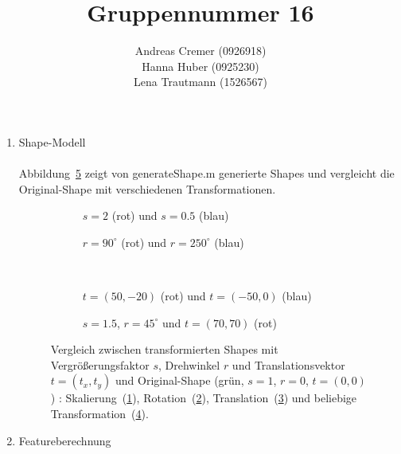 \documentclass[]{report}
\title{Gruppennummer 16}
\author{Andreas Cremer (0926918)\\Hanna Huber (0925230) \\Lena Trautmann (1526567)}
\newlength\figureheight
\newlength\figurewidth
\begin{document}
	\maketitle
	
	
	\begin{enumerate}
		\item Shape-Modell \\\\
			Abbildung~\ref{fig:trafo} zeigt von generateShape.m generierte Shapes und vergleicht die Original-Shape mit verschiedenen Transformationen.
			\setlength\figureheight{3.5cm}
			\setlength{}
			\begin{figure}
				\begin{subfigure}{0.45\textwidth}
					\centering
					
					\caption{$s=2$ (rot) und $s=0.5$ (blau)}
					\label{fig:s}
				\end{subfigure}
				\qquad
				\begin{subfigure}{0.45\textwidth}
					\centering
					
					\caption{$r=90^\circ$ (rot) und $r=250^\circ$  (blau)}
					\label{fig:r}
				\end{subfigure}	
				\\
				\begin{subfigure}{0.45\textwidth}
					\centering
					
					\caption{$t=(50,-20)$ (rot) und $t=(-50,0)$ (blau)}
					\label{fig:t}
				\end{subfigure}
				\qquad
				\begin{subfigure}{0.45\textwidth}
					\centering
					
					\caption{$s=1.5$, $r=45^\circ$ und $t=(70,70)$ (rot)}
					\label{fig:mix}
				\end{subfigure}	
				\caption{Vergleich zwischen transformierten Shapes mit Vergrößerungsfaktor $s$, Drehwinkel $r$ und Translationsvektor $t=(t_x,t_y)$ und Original-Shape (grün, $s=1$, $r=0$, $t=(0,0)$) : Skalierung~(\ref{fig:s}), Rotation~(\ref{fig:r}), Translation~(\ref{fig:t}) und beliebige Transformation~(\ref{fig:mix}).}
				\label{fig:trafo}
			\end{figure}
			

		\item Featureberechnung
			

\end{enumerate}
\end{document}
